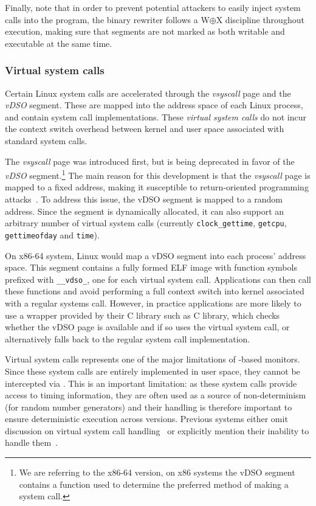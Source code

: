 Finally, note that in order to prevent potential attackers to easily inject
system calls into the program, the binary rewriter follows a
W$\mathbin{\oplus}$X discipline throughout execution, making sure that
segments are not marked as both writable and executable at the same
time.


\subsubsection{Virtual system calls}
\label{sec:vsyscall}

Certain Linux system calls are accelerated through the \emph{vsyscall}
page and the \emph{vDSO} segment. These are mapped into the address
space of each Linux process, and contain system call
implementations. These \textit{virtual system calls} do not incur the
context switch overhead between kernel and user space associated with
standard system calls.

The \emph{vsyscall} page was introduced first, but is being deprecated in favor
of the \emph{vDSO} segment.\footnote{We are referring to the x86-64 version, on x86
systems the vDSO segment contains a function used to determine the preferred
method of making a system call.} The main reason for this development is that
the \emph{vsyscall} page is mapped to a fixed address, making it susceptible to
return-oriented programming attacks~\cite{ROP:tissec12}. To address this issue,
the vDSO segment is mapped to a random address. Since the segment is
dynamically allocated, it can also support an arbitrary number of virtual
system calls (currently \lstinline`clock_gettime`, \lstinline`getcpu`,
\lstinline`gettimeofday` and \lstinline`time`).

On x86-64 system, Linux would map a vDSO segment into each process' address
space. This segment contains a fully formed ELF image with function symbols
prefixed with \lstinline`__vdso_`, one for each virtual system call.
Applications can then call these functions and avoid performing a full context
switch into kernel associated with a regular systems call. However, in practice
applications are more likely to use a wrapper provided by their C library such
as \gnu C library, which checks whether the vDSO page is available and if so
uses the virtual system call, or alternatively falls back to the regular system
call implementation.

Virtual system calls represents one of the major limitations of \ptrace-based
monitors. Since these system calls are entirely implemented in user space, they
cannot be intercepted via \ptrace.  This is an important limitation: as these
system calls provide access to timing information, they are often used as a
source of non-determinism (\eg for random number generators) and their handling
is therefore important to ensure deterministic execution across versions.
Previous systems either omit discussion on virtual system call
handling~\cite{mx,orchestra11} or explicitly mention their inability to handle
them~\cite{tachyon12}.

